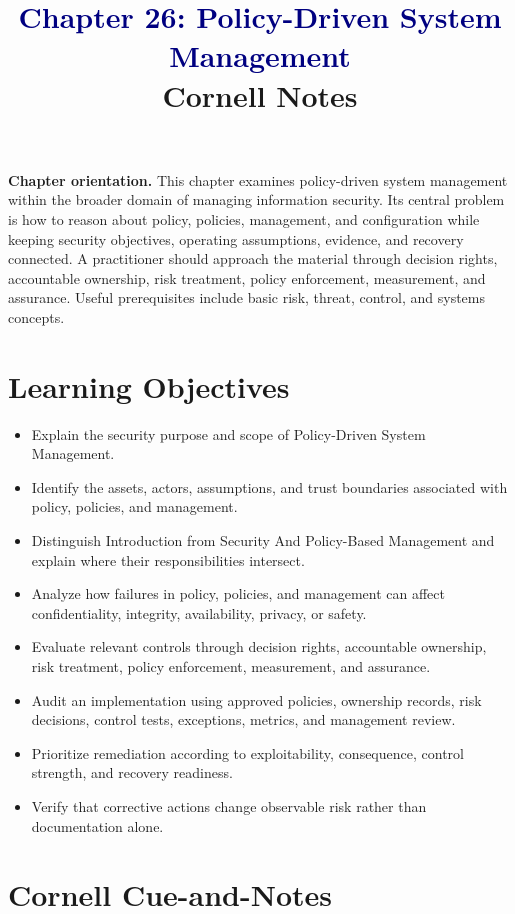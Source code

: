 \documentclass[11pt]{article}
\title{\textcolor{Navy}{Chapter 26: Policy-Driven System Management}\\[2mm]\large Cornell Notes}
\author{}
\date{}
\begin{document}
\maketitle
\thispagestyle{fancy}
\vspace{-1.5em}
\begin{orientationbox}
\textbf{Chapter orientation.} This chapter examines policy-driven system management within the broader domain of managing information security. Its central problem is how to reason about policy, policies, management, and configuration while keeping security objectives, operating assumptions, evidence, and recovery connected. A practitioner should approach the material through decision rights, accountable ownership, risk treatment, policy enforcement, measurement, and assurance. Useful prerequisites include basic risk, threat, control, and systems concepts.
\end{orientationbox}
\section*{Learning Objectives}
\begin{itemize}
\item Explain the security purpose and scope of Policy-Driven System Management.
\item Identify the assets, actors, assumptions, and trust boundaries associated with policy, policies, and management.
\item Distinguish Introduction from Security And Policy-Based Management and explain where their responsibilities intersect.
\item Analyze how failures in policy, policies, and management can affect confidentiality, integrity, availability, privacy, or safety.
\item Evaluate relevant controls through decision rights, accountable ownership, risk treatment, policy enforcement, measurement, and assurance.
\item Audit an implementation using approved policies, ownership records, risk decisions, control tests, exceptions, metrics, and management review.
\item Prioritize remediation according to exploitability, consequence, control strength, and recovery readiness.
\item Verify that corrective actions change observable risk rather than documentation alone.
\end{itemize}
\section*{Cornell Cue-and-Notes}
\end{document}
